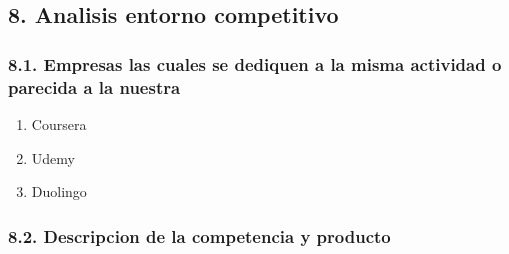 \documentclass[
]{article}
\begin{document}
\newpage

\subsection{8. Analisis entorno
competitivo}\label{analisis-entorno-competitivo}

\subsubsection{8.1. Empresas las cuales se dediquen a la misma actividad
o parecida a la
nuestra}\label{empresas-las-cuales-se-dediquen-a-la-misma-actividad-o-parecida-a-la-nuestra}

\begin{enumerate}
\def\labelenumi{\alph{enumi}.}
\item
  Coursera
\item
  Udemy
\item
  Duolingo
\end{enumerate}

\subsubsection{8.2. Descripcion de la competencia y
producto}\label{descripcion-de-la-competencia-y-producto}
\end{document}
